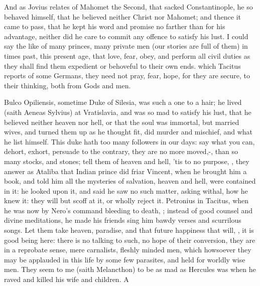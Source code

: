 {And as Jovius relates of Mahomet the Second, that sacked
Constantinople, he so behaved himself, that he believed neither Christ
nor Mahomet; and thence it came to pass, that he kept his word and
promise no farther than for his advantage, neither did he care to
commit any offence to satisfy his lust. I could say the like of many
princes, many private men (our stories are full of them) in times past,
this present age, that love, fear, obey, and perform all civil duties
as they shall find them expedient or behoveful to their own ends.
which  Tacitus reports of some Germans, they need not pray, fear,
hope, for they are secure, to their thinking, both from Gods and men.

Bulco Opiliensis, sometime Duke of Silesia, was such a one to a
hair; he lived (saith Aeneas Sylvius) at Vratislavia, and
was so mad to satisfy his lust, that he believed neither heaven nor
hell, or that the soul was immortal, but married wives, and turned them
up as he thought fit, did murder and mischief, and what he list
himself. This duke hath too many followers in our days: say what you
can, dehort, exhort, persuade to the contrary, they are no more
moved,-, than so many
stocks, and stones; tell them of heaven and hell, 'tis to no purpose,
, they answer as Ataliba that Indian prince did friar
Vincent, when he brought him a book, and told him all the
mysteries of salvation, heaven and hell, were contained in it: he
looked upon it, and said he saw no such matter, asking withal, how he
knew it: they will but scoff at it, or wholly reject it. Petronius in
Tacitus, when he was now by Nero's command bleeding to death, ; instead of good counsel
and divine meditations, he made his friends sing him bawdy verses and
scurrilous songs. Let them take heaven, paradise, and that future
happiness that will, , it is good being here: there
is no talking to such, no hope of their conversion, they are in a
reprobate sense, mere carnalists, fleshly minded men, which howsoever
they may be applauded in this life by some few parasites, and held for
worldly wise men. They seem to me (saith Melancthon) to be as mad
as Hercules was when he raved and killed his wife and children. A
}
